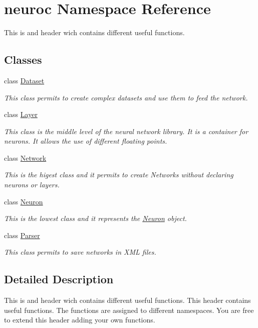 \hypertarget{namespaceneuroc}{\section{neuroc Namespace Reference}
\label{namespaceneuroc}
}


This is and header wich contains different useful functions.  


\subsection*{Classes}
\begin{DoxyCompactItemize}
\item 
class \hyperlink{classneuroc_1_1_dataset}{Dataset}
\begin{DoxyCompactList}\small\item\em This class permits to create complex datasets and use them to feed the network. \end{DoxyCompactList}\item 
class \hyperlink{classneuroc_1_1_layer}{Layer}
\begin{DoxyCompactList}\small\item\em This class is the middle level of the neural network library. It is a container for neurons. It allows the use of different floating points. \end{DoxyCompactList}\item 
class \hyperlink{classneuroc_1_1_network}{Network}
\begin{DoxyCompactList}\small\item\em This is the higest class and it permits to create Networks without declaring neurons or layers. \end{DoxyCompactList}\item 
class \hyperlink{classneuroc_1_1_neuron}{Neuron}
\begin{DoxyCompactList}\small\item\em This is the lowest class and it represents the \hyperlink{classneuroc_1_1_neuron}{Neuron} object. \end{DoxyCompactList}\item 
class \hyperlink{classneuroc_1_1_parser}{Parser}
\begin{DoxyCompactList}\small\item\em This class permits to save networks in X\-M\-L files. \end{DoxyCompactList}\end{DoxyCompactItemize}


\subsection{Detailed Description}
This is and header wich contains different useful functions. This header contains useful functions. The functions are assigned to different namespaces. You are free to extend this header adding your own functions. 